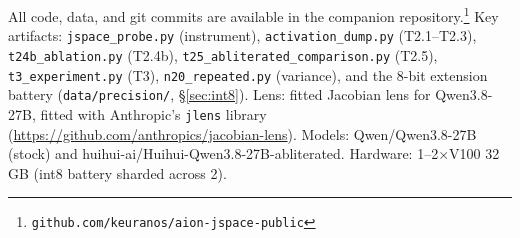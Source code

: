 \documentclass[11pt,a4paper]{article}
\begin{document}
All code, data, and git commits are available in the companion repository.\footnote{\texttt{github.com/keuranos/aion-jspace-public}} Key artifacts: \texttt{jspace\_probe.py} (instrument), \texttt{activation\_dump.py} (T2.1--T2.3), \texttt{t24b\_ablation.py} (T2.4b), \texttt{t25\_abliterated\_comparison.py} (T2.5), \texttt{t3\_experiment.py} (T3), \texttt{n20\_repeated.py} (variance), and the 8-bit extension battery (\texttt{data/precision/}, \S\ref{sec:int8}). Lens: fitted Jacobian lens for Qwen3.8-27B, fitted with Anthropic's \texttt{jlens} library~\cite{jacobianlens2026} (\url{https://github.com/anthropics/jacobian-lens}). Models: Qwen/Qwen3.8-27B (stock) and huihui-ai/Huihui-Qwen3.8-27B-abliterated. Hardware: 1--2$\times$V100 32\,GB (int8 battery sharded across 2).



\end{document}
